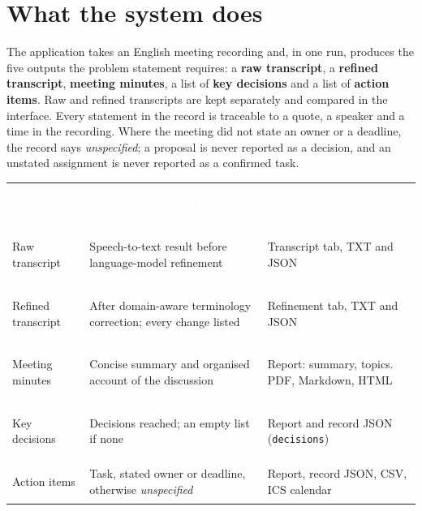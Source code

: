 \documentclass[10pt,a4paper]{article}
\newcommand{\tag}[1]{\textcolor{brand}{\textbf{#1}}}
\newcommand{\code}[1]{\texttt{\small #1}}
\newcommand{\HC}[1]{\textcolor{white}{\textbf{#1}}}
\begin{document}
\noindent
{}

\section{What the system does}
The application takes an English meeting recording and, in one run, produces the five outputs the problem statement requires: a \tag{raw transcript}, a \tag{refined transcript}, \tag{meeting minutes}, a list of \tag{key decisions} and a list of \tag{action items}. Raw and refined transcripts are kept separately and compared in the interface. Every statement in the record is traceable to a quote, a speaker and a time in the recording. Where the meeting did not state an owner or a deadline, the record says \emph{unspecified}; a proposal is never reported as a decision, and an unstated assignment is never reported as a confirmed task.

\begin{tabularx}{\textwidth}{@{}>{\bfseries\raggedright\arraybackslash}p{2.9cm}Y L{4.7cm}@{}}
\HC{Output}&\HC{Content (from the brief)}&\HC{Where it is produced and exported}\\
Raw transcript & Speech-to-text result before language-model refinement & Transcript tab, TXT and JSON\\
Refined transcript & After domain-aware terminology correction; every change listed & Refinement tab, TXT and JSON\\
Meeting minutes & Concise summary and organised account of the discussion & Report: summary, topics. PDF, Markdown, HTML\\
Key decisions & Decisions reached; an empty list if none & Report and record JSON (\code{decisions})\\
Action items & Task, stated owner or deadline, otherwise \emph{unspecified} & Report, record JSON, CSV, ICS calendar\\
\end{tabularx}
\end{document}
